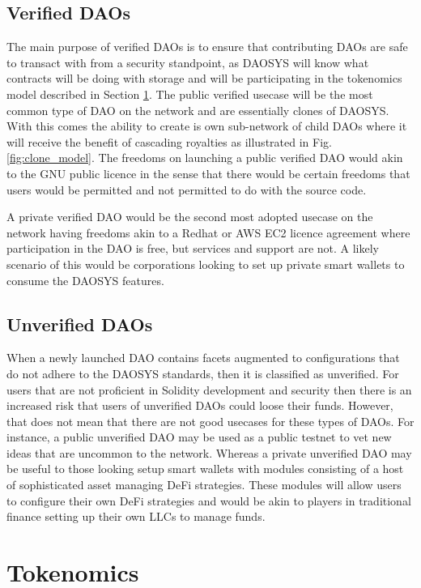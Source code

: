 \documentclass[journal,twocolumn,12pt]{ieeesyscoin}
\begin{document}
\subsection{Verified DAOs}
\label{sec:verified}

The main purpose of verified DAOs is to ensure that contributing DAOs are safe to transact with from a security standpoint, as DAOSYS will know what contracts will be doing with storage and will be participating in the tokenomics model described in Section \ref{sec:tokenomics}. The public verified usecase will be the most common type of DAO on the network and are essentially clones of DAOSYS. With this comes the ability to create is own sub-network of child DAOs where it will receive the benefit of cascading royalties as illustrated in Fig. \ref{fig:clone_model}. The freedoms on launching a public verified DAO would akin to the GNU public licence in the sense that there would be certain freedoms that users would be permitted and not permitted to do with the source code.

A private verified DAO would be the second most adopted usecase on the network having freedoms akin to a Redhat or AWS EC2 licence agreement where participation in the DAO is free, but services and support are not. A likely scenario of this would be corporations looking to set up private smart wallets to consume the DAOSYS features.

\subsection{Unverified DAOs}
\label{sec:unverified}

When a newly launched DAO contains facets augmented to configurations that do not adhere to the DAOSYS standards, then it is classified as unverified. For users that are not proficient in Solidity development and security then there is an increased risk that users of unverified DAOs could loose their funds. However, that does not mean that there are not good usecases for these types of DAOs. For instance, a public unverified DAO may be used as a public testnet to vet new ideas that are uncommon to the network. Whereas a private unverified DAO may be useful to those looking setup smart wallets with modules consisting of a host of sophisticated asset managing DeFi strategies. These modules will allow users to configure their own DeFi strategies and would be akin to players in traditional finance setting up their own LLCs to manage funds.

\section{Tokenomics}
\label{sec:tokenomics}
\end{document}
